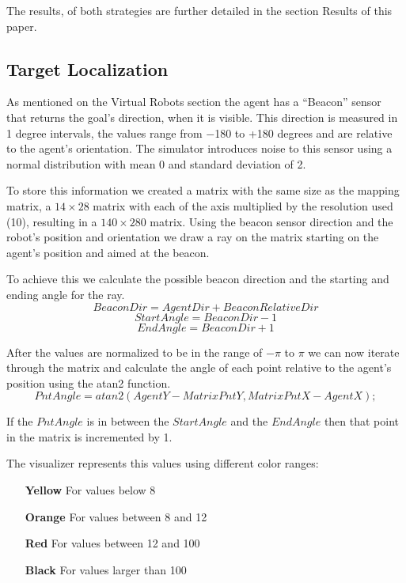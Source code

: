 \documentclass[oribibl]{llncs}
\begin{document}
The results, of both strategies are further detailed in the section Results of this paper.

\subsection{Target Localization}
As mentioned on the Virtual Robots section the agent has a ``Beacon''
sensor that returns the goal's direction, when it is visible. This direction
is measured in 1 degree intervals, the values range from $-$180 to +180 degrees and
are relative to the agent's orientation. The simulator introduces noise to this sensor
using a normal distribution with mean 0 and standard deviation of 2.

To store this information we created a matrix with the same size as the
mapping matrix, a $14\times28$ matrix with each of the axis multiplied by the resolution
used (10), resulting in a $140\times280$ matrix. Using the beacon sensor direction and the
robot's position and orientation we draw a ray on the matrix starting on the agent's
position and aimed at the beacon.

To achieve this we calculate the possible beacon direction and the starting and ending
angle for the ray.
\begin{equation}
BeaconDir = AgentDir + BeaconRelativeDir
\end{equation}
\begin{equation}
StartAngle = BeaconDir - 1
\end{equation}
\begin{equation}
EndAngle = BeaconDir + 1
\end{equation}

After the values are normalized to be in the range of $-\pi$ to $\pi$ we can now
iterate through the matrix and calculate the angle of each
point relative to the agent's position using the atan2 function.
\begin{equation}
PntAngle = atan2(AgentY - MatrixPntY, MatrixPntX - AgentX);
\end{equation}

If the $PntAngle$ is in between the $StartAngle$ and the $EndAngle$ then that point in the
matrix is incremented by 1.

The visualizer represents this values using different color ranges:
\begin{itemize}
  \item[\textbf{Yellow}] For values below 8
  \item[\textbf{Orange}] For values between 8 and 12
  \item[\textbf{Red}] For values between 12 and 100
  \item[\textbf{Black}]For values larger than 100
\end{itemize}
\end{document}
